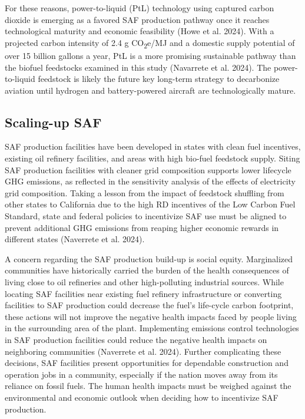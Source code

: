 \documentclass[12pt]{article}
\begin{document}
For these reasons, power-to-liquid (PtL) technology using captured carbon dioxide is emerging as a favored SAF production pathway once it reaches technological maturity and economic feasibility (Howe et al. 2024). With a projected carbon intensity of 2.4 g CO\textsubscript{2}e/MJ and a domestic supply potential of over 15 billion gallons a year, PtL is a more promising sustainable pathway than the biofuel feedstocks examined in this study (Navarrete et al. 2024). The power-to-liquid feedstock is likely the future key long-term strategy to decarbonize aviation until hydrogen and battery-powered aircraft are technologically mature. 


\subsection{Scaling-up SAF}

SAF production facilities have been developed in states with clean fuel incentives, existing oil refinery facilities, and areas with high bio-fuel feedstock supply. Siting SAF production facilities with cleaner grid composition supports lower lifecycle GHG emissions, as reflected in the sensitivity analysis of the effects of electricity grid composition. Taking a lesson from the impact of feedstock shuffling from other states to California due to the high RD incentives of the Low Carbon Fuel Standard, state and federal policies to incentivize SAF use must be aligned to prevent additional GHG emissions from reaping higher economic rewards in different states (Naverrete et al. 2024). 

A concern regarding the SAF production build-up is social equity. Marginalized communities have historically carried the burden of the health consequences of living close to oil refineries and other high-polluting industrial sources. While locating SAF facilities near existing fuel refinery infrastructure or converting facilities to SAF production could decrease the fuel’s life-cycle carbon footprint, these actions will not improve the negative health impacts faced by people living in the surrounding area of the plant. Implementing emissions control technologies in SAF production facilities could reduce the negative health impacts on neighboring communities (Naverrete et al. 2024). Further complicating these decisions, SAF facilities present opportunities for dependable construction and operation jobs in a community, especially if the nation moves away from its reliance on fossil fuels. The human health impacts must be weighed against the environmental and economic outlook when deciding how to incentivize SAF production.
\end{document}
